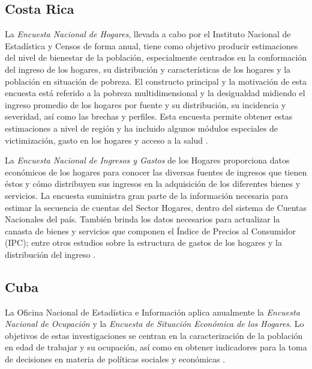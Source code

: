 \documentclass[
  10pt,
  spanish,
]{book}
\begin{document}
\hypertarget{costa-rica}{%
\subsection*{Costa Rica}\label{costa-rica}}

La \emph{Encuesta Nacional de Hogares}, llevada a cabo por el Instituto Nacional de Estadística y Censos de forma anual, tiene como objetivo producir estimaciones del nivel de bienestar de la población, especialmente centrados en la conformación del ingreso de los hogares, su distribución y características de los hogares y la población en situación de pobreza. El constructo principal y la motivación de esta encuesta está referido a la pobreza multidimensional y la desigualdad midiendo el ingreso promedio de los hogares por fuente y su distribución, su incidencia y severidad, así como las brechas y perfiles. Esta encuesta permite obtener estas estimaciones a nivel de región y ha incluido algunos módulos especiales de victimización, gasto en los hogares y acceso a la salud \citep{INEC-CR_2017}.

La \emph{Encuesta Nacional de Ingresos y Gastos} de los Hogares proporciona datos económicos de los hogares para conocer las diversas fuentes de ingresos que tienen éstos y cómo distribuyen sus ingresos en la adquisición de los diferentes bienes y servicios. La encuesta suministra gran parte de la información necesaria para estimar la secuencia de cuentas del Sector Hogares, dentro del sistema de Cuentas Nacionales del país. También brinda los datos necesarios para actualizar la canasta de bienes y servicios que componen el Índice de Precios al Consumidor (IPC); entre otros estudios sobre la estructura de gastos de los hogares y la distribución del ingreso \citep{INEC-CR_2018}.

\hypertarget{cuba}{%
\subsection*{Cuba}\label{cuba}}

La Oficina Nacional de Estadística e Información aplica anualmente la \emph{Encuesta Nacional de Ocupación} y la \emph{Encuesta de Situación Económica de los Hogares}. Lo objetivos de estas investigaciones se centran en la caracterización de la población en edad de trabajar y su ocupación, así como en obtener indicadores para la toma de decisiones en materia de políticas sociales y económicas \citep{ONE-CU}.
\end{document}

